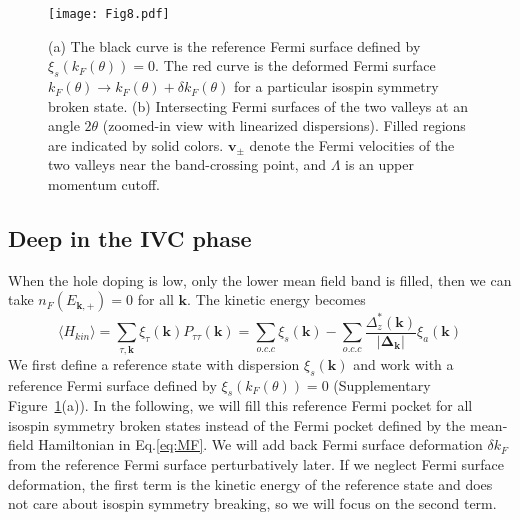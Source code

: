 \documentclass[aps,pra,twocolumn,superscriptaddress,10pt,article,nofootinbib,showpacs,longbibliography]{revtex4-1}
\def \k{{\mathbf k}}
\def \v{{\mathbf v}}
\begin{document}
\begin{figure}
    \centering
    \texttt{[image: Fig8.pdf]}
    \caption{(a) The black curve is the reference Fermi surface defined by $\xi_s(k_F(\theta)) = 0$. The red curve is the deformed Fermi surface $k_F (\theta) \to k_F (\theta) + \delta k_F (\theta)$ for a particular isospin symmetry broken state. (b) Intersecting Fermi surfaces of the two valleys at an angle $2\theta$ (zoomed-in view with linearized dispersions). Filled regions are indicated by solid colors. $\v_\pm$ denote the Fermi velocities of the two valleys near the band-crossing point, and $\Lambda$ is an upper momentum cutoff.}
    \label{fig:FSCrossing}
\end{figure}

\subsection{Deep in the IVC phase}

When the hole doping is low, only the lower mean field band is filled, then we can take $n_F(E_{\k,+}) = 0$ for all $\k$. The kinetic energy becomes 
\begin{equation} \label{eq:kinetic}
    \langle H_{kin} \rangle = \sum_{\tau, \k} \xi_\tau(\k) P_{\tau \tau}(\k) =  \sum_{o.c.c} \xi_s(\k) - \sum_{o.c.c} \frac{\Delta^*_{z}(\k)}{|\boldsymbol{\Delta}_{\k}|} \xi_a(\k)
\end{equation}
We first define a reference state with dispersion $\xi_s(\k)$ and work with a reference Fermi surface defined by $\xi_s(k_F(\theta)) = 0$ (Supplementary Figure~\ref{fig:FSCrossing}(a)). In the following, we will fill this reference Fermi pocket for all isospin symmetry broken states instead of the Fermi pocket defined by the mean-field Hamiltonian in Eq.\eqref{eq:MF}. We will add back Fermi surface deformation $\delta k_F$ from the reference Fermi surface perturbatively later. If we neglect Fermi surface deformation, the first term is the kinetic energy of the reference state and does not care about isospin symmetry breaking, so we will focus on the second term.
\end{document}
